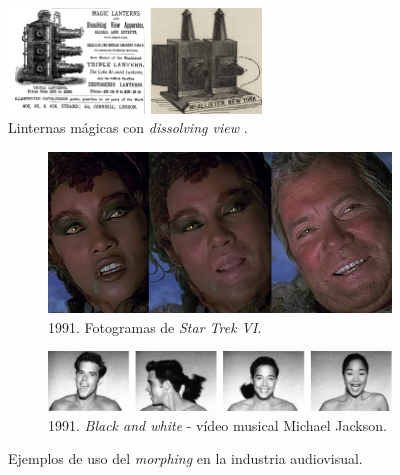 \begin{figure}[h!]
    \centering
    \includegraphics[width=0.6\textwidth]{ch-sistemasABC/images/ch-morphing/old/DisolvingViews.png}
    \caption{Linternas mágicas con \textit{dissolving view} \cite{higson2016dissolving}.}
    \label{fig:disolving_views}
\end{figure}

\begin{figure}[t!]
     \centering
    \begin{subfigure}[b]{0.6\textwidth}
        \centering
        \includegraphics[width=\textwidth]{ch-sistemasABC/images/ch-morphing/old/artist_morphing_01.png}
        \caption{1991. Fotogramas de \textit{Star Trek VI}.}
    \end{subfigure}
    \newline
    \begin{subfigure}[b]{0.8\textwidth}
        \centering
        \includegraphics[width=\textwidth]{ch-sistemasABC/images/ch-morphing/old/artist_morphing_02.png}
        \caption{1991. \textit{Black and white} - vídeo musical Michael Jackson.}
    \end{subfigure}
    \caption{Ejemplos de uso del \textit{morphing} en la industria audiovisual.}
    \label{fig:first_morphing_samples}
\end{figure}

